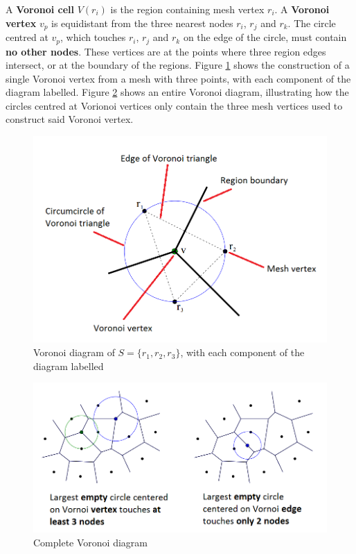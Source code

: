 \documentclass{article}
\begin{document}
A \textbf{Voronoi cell} $V(r_i)$ is the region containing mesh vertex $r_i$. A \textbf{Voronoi vertex} $v_p$ is equidistant from the three nearest nodes $r_i$, $r_j$ and $r_k$. The circle centred at $v_p$, which touches $r_i$, $r_j$ and $r_k$ on the edge of the circle, must contain \textbf{no other nodes}. These vertices are at the points where three region edges intersect, or at the boundary of the regions. Figure \ref{fig:voronoi-vertex} shows the construction of a single Voronoi vertex from a mesh with three points, with each component of the diagram labelled. Figure \ref{fig:voronoi-diagram} shows an entire Voronoi diagram, illustrating how the circles centred at Vorionoi vertices only contain the three mesh vertices used to construct said Voronoi vertex.

\begin{figure}
	\centering
	\includegraphics[scale=0.45]{figures/voronoi-vertex.png}
	\caption{Voronoi diagram of $S = \lbrace r_1, r_2, r_3 \rbrace$, with each component of the diagram labelled}
	\label{fig:voronoi-vertex}
\end{figure}

\begin{figure}
	\centering
	\includegraphics[scale=0.45]{figures/voronoi-diagram.png}
	\caption{Complete Voronoi diagram}
	\label{fig:voronoi-diagram}
\end{figure}
\end{document}
